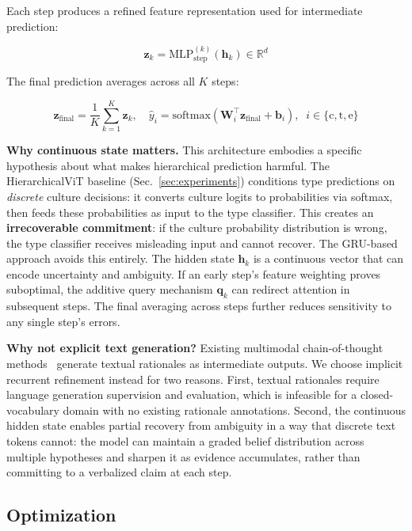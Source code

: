 \documentclass[10pt,twocolumn,letterpaper]{article}
\begin{document}
Each step produces a refined feature representation used for intermediate prediction:

\begin{equation}
\mathbf{z}_k = \text{MLP}_{\text{step}}^{(k)}(\mathbf{h}_k) \in \mathbb{R}^{d}
\label{eq:step_feat}
\end{equation}

The final prediction averages across all $K$ steps:

\begin{equation}
\mathbf{z}_{\text{final}} = \frac{1}{K}\sum_{k=1}^{K} \mathbf{z}_k, \quad
\hat{y}_i = \text{softmax}(\mathbf{W}_i^{\top} \mathbf{z}_{\text{final}} + \mathbf{b}_i), \;\; i \in \{\text{c}, \text{t}, \text{e}\}
\label{eq:final}
\end{equation}

\textbf{Why continuous state matters.} This architecture embodies a specific hypothesis about what makes hierarchical prediction harmful. The HierarchicalViT baseline (Sec.~\ref{sec:experiments}) conditions type predictions on \emph{discrete} culture decisions: it converts culture logits to probabilities via softmax, then feeds these probabilities as input to the type classifier. This creates an \textbf{irrecoverable commitment}: if the culture probability distribution is wrong, the type classifier receives misleading input and cannot recover. The GRU-based approach avoids this entirely. The hidden state $\mathbf{h}_k$ is a continuous vector that can encode uncertainty and ambiguity. If an early step's feature weighting proves suboptimal, the additive query mechanism $\mathbf{q}_k$ can redirect attention in subsequent steps. The final averaging across steps further reduces sensitivity to any single step's errors.

\textbf{Why not explicit text generation?} Existing multimodal chain-of-thought methods~\cite{zhang2023multicot, zheng2023ddcot} generate textual rationales as intermediate outputs. We choose implicit recurrent refinement instead for two reasons. First, textual rationales require language generation supervision and evaluation, which is infeasible for a closed-vocabulary domain with no existing rationale annotations. Second, the continuous hidden state enables partial recovery from ambiguity in a way that discrete text tokens cannot: the model can maintain a graded belief distribution across multiple hypotheses and sharpen it as evidence accumulates, rather than committing to a verbalized claim at each step.

\subsection{Optimization}
\end{document}
